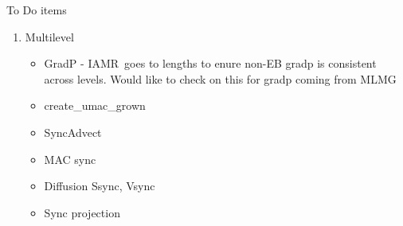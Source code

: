 \documentclass[11pt]{report}
\newcommand{\iamr}{{\sf IAMR}}
\begin{document}
To Do items
\begin{enumerate}
\item
  Multilevel
  \begin{itemize}
  \item
    GradP - \iamr\ goes to lengths to enure non-EB gradp is consistent across levels. Would like to check on this for gradp coming from MLMG
  \item
    create\_umac\_grown
  \item
    SyncAdvect
  \item
    MAC sync
  \item
    Diffusion Ssync, Vsync 
  \item
    Sync projection
  \end{itemize}
\end{enumerate}
\end{document}
